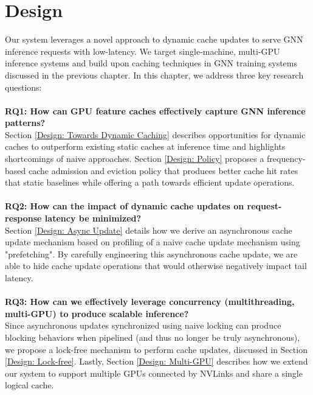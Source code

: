 \chapter{Design}
Our system leverages a novel approach to dynamic cache updates to serve GNN inference requests with low-latency. 
We target single-machine, multi-GPU inference systems and build upon caching techniques in GNN training systems discussed in the previous chapter. 
In this chapter, we address three key research questions:
\\ \\
\noindent \textbf{RQ1: How can GPU feature caches effectively capture GNN inference patterns?} \\
Section \ref{Design: Towards Dynamic Caching} describes opportunities for dynamic caches to outperform existing static caches at inference time and highlights shortcomings of naive approaches. Section \ref{Design: Policy} proposes a frequency-based cache admission and eviction policy that produces better cache hit rates that static baselines while offering a path towards efficient update operations.
\\ \\
\noindent \textbf{RQ2: How can the impact of dynamic cache updates on request-response latency be minimized?} \\
Section \ref{Design: Async Update} details how we derive an asynchronous cache update mechanism based on profiling of a naive cache update mechanism using "prefetching". By carefully engineering this asynchronous cache update, we are able to hide cache update operations that would otherwise negatively impact tail latency.
\\ \\
\noindent \textbf{RQ3: How can we effectively leverage concurrency (multithreading, multi-GPU) to produce scalable inference?} \\
Since asynchronous updates synchronized using naive locking can produce blocking behaviors when pipelined (and thus no longer be truly asynchronous), we propose a lock-free mechanism to perform cache updates, discussed in Section \ref{Design: Lock-free}.
Lastly, Section \ref{Design: Multi-GPU} describes how we extend our system to support multiple GPUs connected by NVLinks and share a single logical cache.



